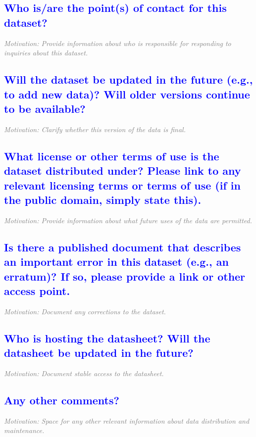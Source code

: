 \documentclass[letterpaper, 10 pt, transmag]{IEEEtran}
\begin{document}
\textcolor{blue}{\subsection{Who is/are the point(s) of contact for this dataset?}}
\textcolor{gray}{\textit{Motivation: Provide information about who is responsible for responding to inquiries about this dataset.}}

\textcolor{blue}{\subsection{Will the dataset be updated in the future (e.g., to add new data)? Will older versions continue to be available?}}
\textcolor{gray}{\textit{Motivation: Clarify whether this version of the data is final.}}

\textcolor{blue}{\subsection{What license or other terms of use is the dataset distributed under? Please link to any relevant licensing terms or terms of use (if in the public domain, simply state this).}}
\textcolor{gray}{\textit{Motivation: Provide information about what future uses of the data are permitted.}}

\textcolor{blue}{\subsection{Is there a published document that describes an important error in this dataset (e.g., an erratum)? If so, please provide a link or other access point.}}
\textcolor{gray}{\textit{Motivation: Document any corrections to the dataset.}}

\textcolor{blue}{\subsection{Who is hosting the datasheet? Will the datasheet be updated in the future?}}
\textcolor{gray}{\textit{Motivation: Document stable access to the datasheet.}}

\textcolor{blue}{\subsection{Any other comments?}}
\textcolor{gray}{\textit{Motivation: Space for any other relevant information about data distribution and maintenance.}}
\vspace{10mm}
\end{document}
